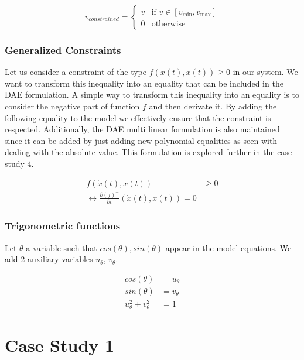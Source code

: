 \documentclass{article}
\begin{document}
\begin{equation}
    v_{constrained} =
    \begin{cases}
        v & \text{if } v \in [v_{\min}, v_{\max}] \\
        0 & \text{otherwise }
    \end{cases}
\end{equation}

\subsubsection{Generalized Constraints}

Let us consider a constraint of the type $f(\dot{x}(t), x(t)) \geq 0$ in our system.
We want to transform this inequality into an equality that can be included
in the DAE formulation. A simple way to transform this inequality into an equality
is to consider the negative part of function $f$ and then derivate it. By adding the
following equality to the model we effectively ensure that the constraint is respected.
Additionally, the DAE multi linear formulation is also maintained since it can be added 
by just adding new polynomial equalities as seen with dealing with the absolute value.
This formulation is explored further in the case study 4.

\begin{align}\label{constraint:general}
    f(\dot{x}(t), x(t)) &\geq 0 \\
    \longleftrightarrow \frac{\partial (f)^-}{\partial t}(\dot{x}(t), x(t)) = 0
\end{align}

\subsubsection*{Trigonometric functions}

Let $\theta$ a variable such that $cos(\theta), sin(\theta)$
appear in the model equations. We add 2 auxiliary variables
$u_{\theta}$, $v_{\theta}$. 

\begin{align}
    cos(\theta) &= u_{\theta}  \\
    sin(\theta) &= v_{\theta} \\
    u_{\theta}^2 + v_{\theta} ^2 &= 1
\end{align}


\section{Case Study 1}
\end{document}
